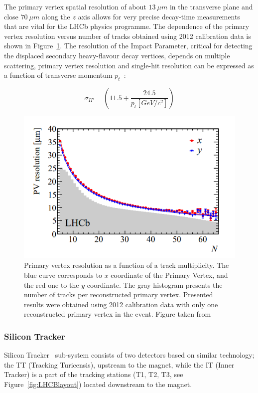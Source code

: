The primary vertex spatial resolution of about $13~\mu m $ in the transverse plane and close $70~\mu m $ along the $z$ axis allows for very precise decay-time measurements that are vital for the LHCb physics programme. The dependence of the primary vertex resolution versus number of tracks obtained using 2012 calibration data is shown in Figure~\ref{fig:veloPerformance}. The resolution of the Impact Parameter, critical for detecting the displaced secondary 
heavy-flavour decay vertices, depends on  multiple scattering, primary vertex resolution and single-hit resolution can be expressed as a function of transverse momentum $p_t$~\cite{veloPerformance}: 

\begin{equation}
    \sigma_{IP} = \left( 11.5  + \frac{24.5}{p_t[GeV/c^2]} \right)
\end{equation}

\begin{figure}[h]
\centering
\includegraphics{figures/VeloResolution.PNG}
\caption{Primary vertex resolution as a function of a track multiplicity. The blue curve corresponds to $x$ coordinate of the Primary Vertex, and the red one to the $y$ coordinate. The gray histogram presents the number of tracks per reconstructed primary vertex. Presented results were obtained using 2012 calibration data with only one reconstructed primary vertex in the event. Figure taken from~\cite{veloPerformance} 
\label{fig:veloPerformance}}
\end{figure}

\subsubsection{Silicon Tracker}
\label{sec:ST}
Silicon Tracker~\cite{Silicon_Tracker} sub-system consists of two detectors based on similar technology; the TT (Tracking Turicensis), upstream to the magnet, while the IT (Inner Tracker) is a part of the tracking stations (T1, T2, T3, see Figure~\ref{fig:LHCBlayout}) located downstream to the magnet.

